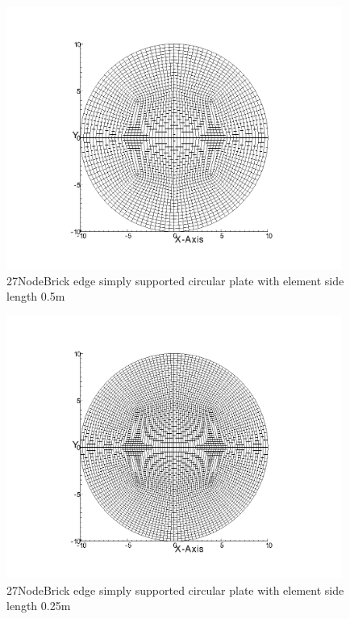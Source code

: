 \documentclass[fleqn,11pt,letter]{article}
\begin{document}
\begin{figure}[H]
  \centering
  \includegraphics[width=11cm]{../Figure_files/27NodeBrick/circular_plate5.png}
  \caption{27NodeBrick edge simply supported circular plate with element side length 0.5m }
  \label{fig 27NodeBrick edges simply supported circular plate with element side length 0.5m }
\end{figure}

\newpage

\begin{figure}[H]
  \centering
  \includegraphics[width=11cm]{../Figure_files/27NodeBrick/circular_plate6.png}
  \caption{27NodeBrick edge simply supported circular plate with element side length 0.25m }
  \label{fig 27NodeBrick edges simply supported circular plate with element side length 0.25m }
\end{figure}
\end{document}
